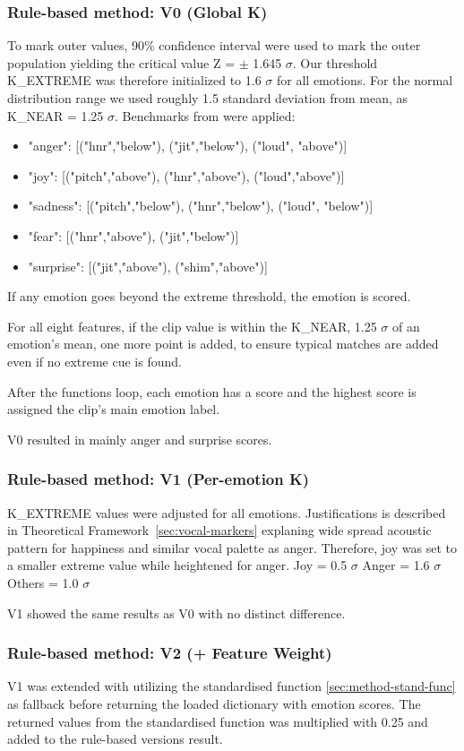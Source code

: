 \subsubsection{Rule-based method: V0 (Global K)}

To mark outer values, 90\% confidence interval were used to mark the outer population \autocite{Bruce2017} yielding the critical value Z = $\pm$ 1.645 $\sigma$. 
Our threshold K\_EXTREME was therefore initialized to 1.6 $\sigma$ for all emotions. For the normal distribution range we used roughly 1.5 standard deviation from mean, as K\_NEAR = 1.25 $\sigma$. 
Benchmarks from \textcite{Ekberg2023} were applied: 
\begin{itemize}
    \item "anger": [("hnr","below"), ("jit","below"), ("loud", "above")]
    \item "joy": [("pitch","above"), ("hnr","above"), ("loud","above")]
    \item "sadness": [("pitch","below"), ("hnr","below"), ("loud", "below")]
    \item "fear": [("hnr","above"), ("jit","below")]
    \item "surprise": [("jit","above"), ("shim","above")]
\end{itemize}
If any emotion goes beyond the extreme threshold, the emotion is scored. 

For all eight features, if the clip value is within the K\_NEAR, 1.25 $\sigma$ of an emotion's mean, one more point is added, to ensure typical matches are added even if no extreme cue is found. 

After the functions loop, each emotion has a score and the highest score is assigned the clip's main emotion label. 

V0 resulted in mainly anger and surprise scores. 
\subsubsection{Rule-based method: V1 (Per-emotion K)}
K\_EXTREME values were adjusted for all emotions. Justifications is described in Theoretical Framework~\ref{sec:vocal-markers} explaning wide spread acoustic pattern for happiness and similar vocal palette as anger. 
Therefore, joy was set to a smaller extreme value while heightened for anger. 
Joy = 0.5 $\sigma$ 
Anger = 1.6 $\sigma$ 
Others = 1.0 $\sigma$

\medskip
V1 showed the same results as V0 with no distinct difference. 

\subsubsection{Rule-based method: V2 (+ Feature Weight)}
V1 was extended with utilizing the standardised function \ref{sec:method-stand-func} as fallback before returning the loaded dictionary with emotion scores. 
The returned values from the standardised function was multiplied with 0.25 and added to the rule-based versions result.

